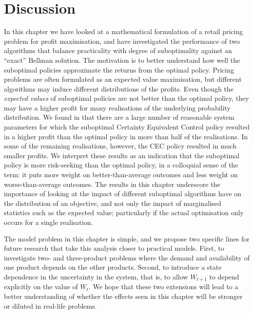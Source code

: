 \documentclass[main.tex]{subfiles}
\begin{document}
\section{Discussion}\label{sec:conclusion}
In this chapter we have looked at a mathematical formulation of a
retail pricing problem for profit maximisation, and have investigated
the performance of two algorithms that balance practicality
with degree of suboptimality against an ``exact'' Bellman
solution. The motivation is to better understand
how well the suboptimal policies approximate the returns from the
optimal policy.
Pricing problems are often formulated as an expected value
maximisation, but different algorithms may induce different
distributions of the profits.
Even though the \emph{expected values} of suboptimal policies are not better
than the optimal policy, they may have a higher profit for many
realisations of the underlying probability distribution.
We found in  that there are a
large number of
reasonable system parameters for which
the suboptimal Certainty Equivalent Control policy resulted in a higher profit
than the optimal policy in more than half of the realisations.
In some of the remaining realisations, however, the CEC policy resulted in
much smaller profits. We interpret these results as an indication that
the suboptimal policy is more risk-seeking than the optimal policy, in
a colloquial sense of the term: it puts more weight on
better-than-average outcomes and less weight on worse-than-average outcomes.
The results in this chapter underscore the importance of looking at
the impact of
different suboptimal algorithms have on the distribution of
an objective, and not only the impact of
marginalised statistics such as the expected value;
particularly if the actual optimisation only occurs for a single realisation.


The model problem in this chapter is simple, and
we propose two specific lines for future research that
take this analysis closer to practical models.
First, to investigate two- and three-product problems where the demand and
availability of one product depends on the other products.
Second, to introduce a state dependence in the uncertainty in the
system, that is, to allow $W_{t+1}$ to depend explicitly on the value
of $W_t$.
We hope that these two extensions will lead to a better understanding of
whether the effects seen in this chapter will be stronger or diluted
in real-life problems.


\biblio{} %
\end{document}
